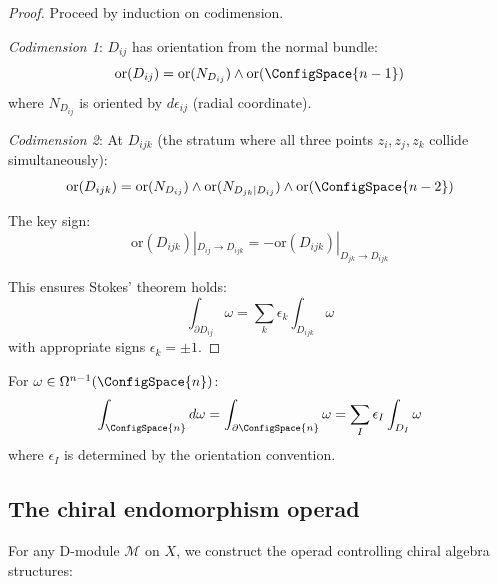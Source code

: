 \begin{proof}
Proceed by induction on codimension.

\emph{Codimension 1}: $D_{ij}$ has orientation from the normal bundle:
\[\text{or}(D_{ij}) = \text{or}(N_{D_{ij}}) \wedge \text{or}(\ConfigSpace{n-1})\]
where $N_{D_{ij}}$ is oriented by $d\epsilon_{ij}$ (radial coordinate).

\emph{Codimension 2}: At $D_{ijk}$ (the stratum where all three points $z_i, z_j, z_k$ collide simultaneously):
\[\text{or}(D_{ijk}) = \text{or}(N_{D_{ij}}) \wedge \text{or}(N_{D_{jk}|D_{ij}}) \wedge \text{or}(\ConfigSpace{n-2})\]

The key sign:
\[\text{or}(D_{ijk})|_{D_{ij} \to D_{ijk}} = -\text{or}(D_{ijk})|_{D_{jk} \to D_{ijk}}\]

This ensures Stokes' theorem holds:
\[\int_{\partial D_{ij}} \omega = \sum_{k} \epsilon_k \int_{D_{ijk}} \omega\]
with appropriate signs $\epsilon_k = \pm 1$.
\end{proof}

\begin{theorem}
\label{thm:stokes-config-spaces}
For $\omega \in \Omega^{n-1}(\ConfigSpace{n})$:
\[\int_{\ConfigSpace{n}} d\omega = \int_{\partial\ConfigSpace{n}} \omega = \sum_{I} \epsilon_I \int_{D_I} \omega\]
where $\epsilon_I$ is determined by the orientation convention.
\end{theorem}


\subsection{The chiral endomorphism operad}

For any D-module $\mathcal{M}$ on $X$, we construct the operad controlling chiral algebra structures:

